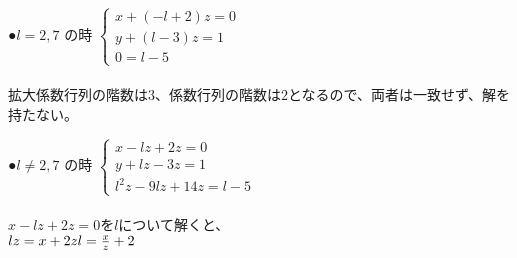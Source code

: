 \documentclass[fleqn]{jsarticle}
\begin{document}
        \begin{description}
            \setlength{\itemsep}{0.5cm}
            \begin{spacing}{1.2}

                \item[●$ l = 2, 7 $ の時]
                    $ \left\{
                        \begin{array}{l}
                            x + (-l + 2)z = 0 \\
                            y + (l - 3)z = 1 \\
                            0 = l - 5
                        \end{array}
                    \right. $ \\\\
                    拡大係数行列の階数は$3$、係数行列の階数は$2$となるので、両者は一致せず、解を持たない。

                \item[●$ l \neq 2, 7 $ の時]
                    $ \left\{
                        \begin{array}{l}
                            x - lz + 2z = 0 \\
                            y + lz - 3z = 1 \\
                            l^2z - 9lz + 14z = l - 5
                        \end{array}
                    \right. $ \\\\
                    $ x - lz + 2z = 0 $を$l$について解くと、\\
                    $ lz = x + 2z \\
                    l = \frac{x}{z} + 2 $

            \end{spacing}
        \end{description}
\end{document}
